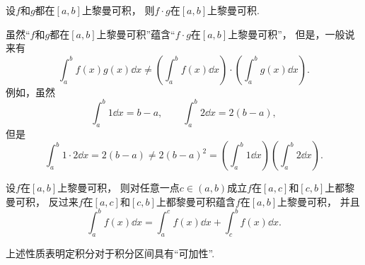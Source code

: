 \begin{property}\label{theorem:定积分.乘积可积性}
设\(f\)和\(g\)都在\([a,b]\)上黎曼可积，
则\(f \cdot g\)在\([a,b]\)上黎曼可积.
\end{property}
\begin{remark}
虽然“\(f\)和\(g\)都在\([a,b]\)上黎曼可积”蕴含“\(f \cdot g\)在\([a,b]\)上黎曼可积”，
但是，一般说来有\begin{equation*}
	\int_a^b f(x) g(x) \dd{x}
	\neq
	\left(
		\int_a^b f(x) \dd{x}
	\right) \cdot \left(
		\int_a^b g(x) \dd{x}
	\right).
\end{equation*}
例如，虽然\begin{equation*}
	\int_a^b 1 \dd{x} = b-a, \qquad
	\int_a^b 2 \dd{x} = 2(b-a),
\end{equation*}
但是\begin{equation*}
	\int_a^b 1\cdot2 \dd{x} = 2(b-a)
	\neq
	2(b-a)^2 = \left(\int_a^b 1 \dd{x}\right) \left(\int_a^b 2 \dd{x}\right).
\end{equation*}
\end{remark}

\begin{property}\label{theorem:定积分.定积分性质3}
设\(f\)在\([a,b]\)上黎曼可积，
则对任意一点\(c\in(a,b)\)成立\(f\)在\([a,c]\)和\([c,b]\)上都黎曼可积，
反过来\(f\)在\([a,c]\)和\([c,b]\)上都黎曼可积蕴含\(f\)在\([a,b]\)上黎曼可积，
并且\begin{equation}
	\int_a^b f(x) \dd{x}
	= \int_a^c f(x) \dd{x}
	+ \int_c^b f(x) \dd{x}.
\end{equation}
\end{property}
上述性质表明定积分对于积分区间具有“可加性”.

